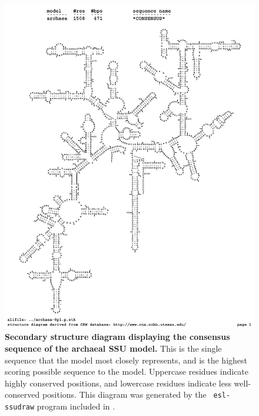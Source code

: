 \vspace{0.2in}
\newpage

\begin{figure}
\begin{center}
\includegraphics[width=5.5in]{../../seeds/ss-diagrams/archaea-0p1-rf}
\end{center}
\caption[Secondary structure diagram displaying the consensus sequence
  of the archaeal SSU model]{\textbf{Secondary structure diagram displaying the
  consensus sequence of the archaeal SSU model.} 
  This is the single sequence that the model 
  most closely represents, and is the highest scoring possible
  sequence to the model. Uppercase residues indicate highly conserved positions,
  and lowercase residues indicate less well-conserved positions.
  This diagram was generated by the {\tt
  esl-ssudraw} program included in .}
\label{fig:arcrf}
\end{figure}

